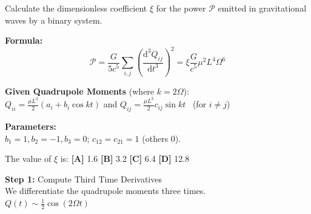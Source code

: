 \begin{minipage}{\linewidth}
\begin{tcolorbox}[
    title={\textbf{IPhO 2018 Q1}},
    colback=white,
    colframe=gray!50!black,
    arc=3pt,
    boxrule=1pt,
    fonttitle=\sffamily\large,
    width=\linewidth
]

    \begin{tcolorbox}[
        colback=gray!5,
        colframe=gray!20,
        coltitle=black,
        title={\small \textbf{QUESTION}},
        fontupper=\small\sffamily,
        boxrule=0.5pt,
        sharp corners,
        left=3pt, right=3pt, top=3pt, bottom=3pt
    ]
        Calculate the dimensionless coefficient $\xi$ for the power $\mathcal{P}$ emitted in gravitational waves by a binary system.
        \vspace{0.5em}
        
        \textbf{Formula:}
        \[ \mathcal{P} = \frac{G}{5 c^{5}} \sum_{i,j} \left(\frac{\mathrm{d}^{3} Q_{i j}}{\mathrm{d} t^{3}}\right)^2 = \xi \frac{G}{c^5} \mu^2 L^4 \Omega^6 \]
        
        \textbf{Given Quadrupole Moments} (where $k = 2\Omega$):\\
        $Q_{ii} = \frac{\mu L^2}{2} (a_i + b_i \cos kt)$ \quad and \quad $Q_{ij} = \frac{\mu L^2}{2} c_{ij} \sin kt$ \ (for $i \neq j$)
        \vspace{0.5em}
        
        \textbf{Parameters:}\\
        $b_1 = 1, b_2 = -1, b_3 = 0$; \quad $c_{12} = c_{21} = 1$ (others 0).
        \vspace{0.5em}
        
        The value of $\xi$ is: \quad
        \textbf{[A]} 1.6 \quad \textbf{[B]} 3.2 \quad \textbf{[C]} 6.4 \quad \textbf{[D]} 12.8
    \end{tcolorbox}

    \vspace{0.5em}

    \noindent
    \begin{minipage}[t]{0.49\linewidth}
        \vspace{0pt}
        \begin{tcolorbox}[
            title={\small \textbf{BASE MODEL}},
            colframe=blue!60!white,
            colback=blue!5!white,
            coltitle=white,
            fontupper=\small\ttfamily\raggedright,
            boxrule=0.5pt,
            sharp corners,
            left=2pt, right=2pt,
            width=\linewidth,
            nobeforeafter
        ]
            \textbf{\textcolor{blue!60!black}{Step 1:}} Compute Third Time Derivatives\\
            We differentiate the quadrupole moments three times.\\
            $Q(t) \sim \frac{1}{2} \cos(2\Omega t)$
            \vspace{1em}
            

\end{tcolorbox}
\end{minipage}
\end{tcolorbox}
\end{minipage}
